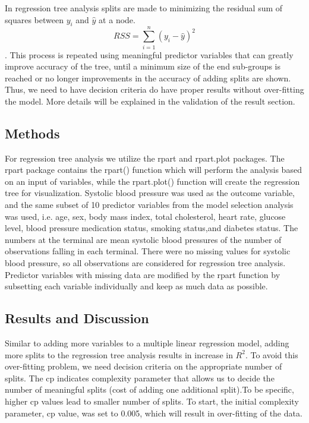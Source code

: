 \documentclass{article}\usepackage[]{graphicx}\usepackage[]{color}
\begin{document}
In regression tree analysis splits are made to minimizing the residual sum of squares between $y_i$ and $\hat{y}$ at a node. $$RSS = \sum_{i=1}^{n}(y_i - \hat{y})^2$$. This process is repeated using meaningful predictor variables that can greatly improve accuracy of the tree, until a minimum size of the end sub-groups is reached or no longer improvements in the accuracy of adding splits are shown. Thus, we need to have decision criteria do have proper results without over-fitting the model. More details will be explained in the validation of the result section. 

\subsection{Methods}

  For regression tree analysis we utilize the rpart and rpart.plot packages.  The rpart package contains the rpart() function which will perform the analysis based on an input of variables, while the rpart.plot() function will create the regression tree for visualization. Systolic blood pressure was used as the outcome variable, and the same subset of 10 predictor variables from the model selection analysis was used, i.e. age, sex, body mass index, total cholesterol, heart rate, glucose level, blood pressure medication status, smoking status,and diabetes status. The numbers at the terminal are mean systolic blood pressures of the number of observations falling in each terminal.
  There were no missing values for systolic blood pressure, so all observations are considered for regression tree analysis. Predictor variables with missing data are modified by the rpart function by subsetting each variable individually and keep as much data as possible.
  





  



\subsection{Results and Discussion}

  Similar to adding more variables to a multiple linear regression model, adding more splits to the regression tree analysis results in increase in $R^2$. To avoid this over-fitting problem, we need decision criteria on the appropriate number of splits. The cp indicates complexity parameter that allows us to decide the number of meaningful splits (cost of adding one additional split).To be specific, higher cp values lead to smaller number of splits. To start, the initial complexity parameter, cp value, was set to 0.005, which will result in over-fitting of the data. 
  
\end{document}
